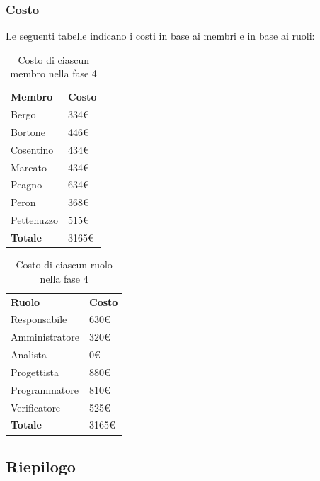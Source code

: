 	\subsubsection{Costo}
		Le seguenti tabelle indicano i costi in base ai membri e in base ai ruoli:
		\begin{table}[H]
			\centering
			\begin{tabular}{| l | l |}
				\rowcolor{LightBlue}
				\textbf{\color{white}Membro}
				& \textbf{\color{white}Costo}\\
				
				Bergo				& 334€\\
				Bortone			& 446€\\
				Cosentino		& 434€\\
				Marcato			& 434€\\
				Peagno				& 634€\\
				Peron				& 368€\\
				Pettenuzzo		& 515€\\ \hline
				\textbf{Totale} & 3165€\\ \hline
			\end{tabular}
			\caption{Costo di ciascun membro nella fase 4}
		\end{table}
		
		\begin{table}[H]
			\centering
			\begin{tabular}{| l | l |}
				\rowcolor{LightBlue}
				\textbf{\color{white}Ruolo}
				& \textbf{\color{white}Costo}\\
				
				Responsabile 		& 630€\\
				Amministratore 	& 320€\\
				Analista 				& 0€\\			
				Progettista 			& 880€\\
				Programmatore 		& 810€\\
				Verificatore 		& 525€\\ \hline
				\textbf{Totale} 	& 3165€\\ \hline
			\end{tabular}		
			\caption{Costo di ciascun ruolo nella fase 4}
		\end{table}

\subsection{Riepilogo}
